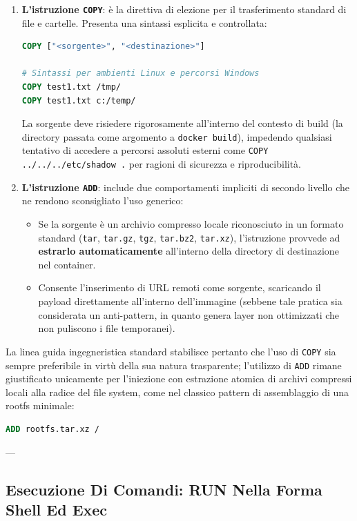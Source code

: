 \documentclass[11pt, a4paper]{article}
\begin{document}
\begin{enumerate}
    \item \textbf{L'istruzione \texttt{COPY}}: è la direttiva di elezione per il trasferimento standard di file e cartelle. Presenta una sintassi esplicita e controllata:
\begin{lstlisting}[language=dockerfile]
COPY ["<sorgente>", "<destinazione>"]

# Sintassi per ambienti Linux e percorsi Windows
COPY test1.txt /tmp/
COPY test1.txt c:/temp/
\end{lstlisting}
    La sorgente deve risiedere rigorosamente all'interno del contesto di build (la directory passata come argomento a \texttt{docker build}), impedendo qualsiasi tentativo di accedere a percorsi assoluti esterni come \texttt{COPY ../../../etc/shadow .} per ragioni di sicurezza e riproducibilità.
    \item \textbf{L'istruzione \texttt{ADD}}: include due comportamenti impliciti di secondo livello che ne rendono sconsigliato l'uso generico:
    \begin{itemize}
        \item Se la sorgente è un archivio compresso locale riconosciuto in un formato standard (\texttt{tar}, \texttt{tar.gz}, \texttt{tgz}, \texttt{tar.bz2}, \texttt{tar.xz}), l'istruzione provvede ad \textbf{estrarlo automaticamente} all'interno della directory di destinazione nel container.
        \item Consente l'inserimento di URL remoti come sorgente, scaricando il payload direttamente all'interno dell'immagine (sebbene tale pratica sia considerata un anti-pattern, in quanto genera layer non ottimizzati che non puliscono i file temporanei).
    \end{itemize}
\end{enumerate}

La linea guida ingegneristica standard stabilisce pertanto che l'uso di \texttt{COPY} sia sempre preferibile in virtù della sua natura trasparente; l'utilizzo di \texttt{ADD} rimane giustificato unicamente per l'iniezione con estrazione atomica di archivi compressi locali alla radice del file system, come nel classico pattern di assemblaggio di una rootfs minimale:
\begin{lstlisting}[language=dockerfile]
ADD rootfs.tar.xz /
\end{lstlisting}

---

\subsection{Esecuzione Di Comandi: RUN Nella Forma Shell Ed Exec}
\end{document}
